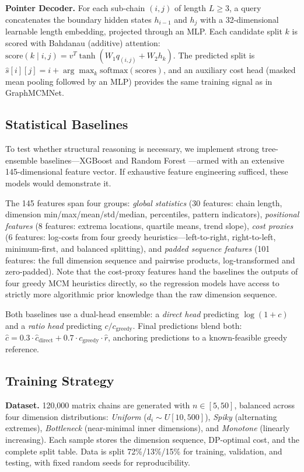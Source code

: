 \documentclass[conference]{IEEEtran}
\begin{document}
\textbf{Pointer Decoder.} For each sub-chain $(i,j)$ of length $L \ge 3$, a
query concatenates the boundary hidden states $h_{i-1}$ and $h_j$ with a
32-dimensional learnable length embedding, projected through an MLP. Each
candidate split $k$ is scored with Bahdanau (additive) attention:
$\mathrm{score}(k \mid i,j) = v^{T}\tanh(W_1 q_{(i,j)} + W_2 h_k)$. The
predicted split is $\hat{s}[i][j] = i + \arg\max_k
\mathrm{softmax}(\mathrm{scores})$, and an auxiliary cost head (masked mean
pooling followed by an MLP) provides the same training signal as in
GraphMCMNet.

\subsection{Statistical Baselines}
To test whether structural reasoning is necessary, we implement strong
tree-ensemble baselines---XGBoost \cite{xgboost2016} and Random Forest
\cite{breiman2001}---armed with an extensive 145-dimensional feature vector.
If exhaustive feature engineering sufficed, these models would demonstrate it.

The 145 features span four groups: \emph{global statistics} (30 features:
chain length, dimension min/max/mean/std/median, percentiles, pattern
indicators), \emph{positional features} (8 features: extrema locations,
quartile means, trend slope), \emph{cost proxies} (6 features: log-costs from
four greedy heuristics---left-to-right, right-to-left, minimum-first, and
balanced splitting), and \emph{padded sequence features} (101 features: the
full dimension sequence and pairwise products, log-transformed and
zero-padded). Note that the cost-proxy features hand the baselines the outputs
of four greedy MCM heuristics directly, so the regression models have access
to strictly more algorithmic prior knowledge than the raw dimension sequence.

Both baselines use a dual-head ensemble: a \emph{direct head} predicting
$\log(1{+}c)$ and a \emph{ratio head} predicting $c/c_{\mathrm{greedy}}$.
Final predictions blend both:
$\hat{c} = 0.3 \cdot \hat{c}_{\mathrm{direct}} + 0.7 \cdot c_{\mathrm{greedy}}
\cdot \hat{r}$, anchoring predictions to a known-feasible greedy reference.

\subsection{Training Strategy}
\textbf{Dataset.} 120{,}000 matrix chains are generated with $n \in [5, 50]$,
balanced across four dimension distributions: \emph{Uniform}
($d_i \sim U[10, 500]$), \emph{Spiky} (alternating extremes),
\emph{Bottleneck} (near-minimal inner dimensions), and \emph{Monotone}
(linearly increasing). Each sample stores the dimension sequence, DP-optimal
cost, and the complete split table. Data is split 72\%/13\%/15\% for
training, validation, and testing, with fixed random seeds for
reproducibility.
\end{document}
